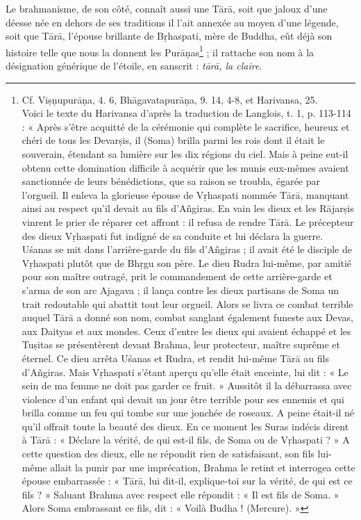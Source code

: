 \documentclass[a4paper, 11pt, oneside, french]{article}
\begin{document}
Le brahmanisme, de son côté, connaît aussi une T\={a}r\={a}, soit que jaloux d'une déesse née en dehors de ses traditions il l'ait annexée au moyen d'une légende, soit que T\={a}r\={a}, l'épouse brillante de B\d{r}haspati, mère de Buddha, eût déjà son histoire telle que nous la donnent les Pur\={a}\d{n}as\footnote{Cf. Vi\d{s}\d{n}upur\={a}\d{n}a, 4. 6, Bh\={a}gavatapur\={a}\d{n}a, 9. 14, 4-8, et Harivansa, 25.\\\hspace*{5mm}Voici le texte du Harivansa d'après la traduction de Langlois, t. 1, p. 113-114 : « Après s'être acquitté de la cérémonie qui complète le sacrifice, heureux et chéri de tous les Devar\d{s}is, il (Soma) brilla parmi les rois dont il était le souverain, étendant sa lumière sur les dix régions du ciel. Mais à peine eut-il obtenu cette domination difficile à acquérir que les munis eux-mêmes avaient sanctionnée de leurs bénédictions, que sa raison se troubla, égarée par l'orgueil. Il enleva la glorieuse épouse de V\d{r}haspati nommée T\={a}r\={a}, manquant ainsi au respect qu'il devait au fils d'A\~{n}giras. En vain les dieux et les R\={a}jar\d{s}is vinrent le prier de réparer cet affront : il refusa de rendre T\={a}r\={a}. Le précepteur des dieux V\d{r}haspati fut indigné de sa conduite et lui déclara la guerre. U\'{s}anas se mit dans l'arrière-garde du fils d'A\~{n}giras ; il avait été le disciple de V\d{r}haspati plutôt que de Bh\d{r}gu son père. Le dieu Rudra lui-même, par amitié pour son maître outragé, prit le commandement de cette arrière-garde et s'arma de son arc Ajagava ; il lança contre les dieux partisans de Soma un trait redoutable qui abattit tout leur orgueil. Alors se livra ce combat terrible auquel T\={a}r\={a} a donné son nom, combat sanglant également funeste aux Devas, aux Daityas et aux mondes. Ceux d'entre les dieux qui avaient échappé et les Tu\d{s}itas se présentèrent devant Brahma, leur protecteur, maître suprême et éternel. Ce dieu arrêta U\'{s}anas et Rudra, et rendit lui-même T\={a}r\={a} au fils d'A\~{n}giras. Mais V\d{r}haspati s'étant aperçu qu'elle était enceinte, lui dit : « Le sein de ma femme ne doit pas garder ce fruit. » Aussitôt il la débarrassa avec violence d'un enfant qui devait un jour être terrible pour ses ennemis et qui brilla comme un feu qui tombe sur une jonchée de roseaux. A peine était-il né qu'il offrait toute la beauté des dieux. En ce moment les Suras indécis dirent à T\={a}r\={a} : « Déclare la vérité, de qui est-il fils, de Soma ou de V\d{r}haspati ? » A cette question des dieux, elle ne répondit rien de satisfaisant, son fils lui-même allait la punir par une imprécation, Brahma le retint et interrogea cette épouse embarrassée : « T\={a}r\={a}, lui dit-il, explique-toi sur la vérité, de qui est ce fils ? » Saluant Brahma avec respect elle répondit : « Il est fils de Soma. » Alors Soma embrassant ce fils, dit : « Voilà Budha ! (Mercure). »} ; il rattache son nom à la désignation générique de l'étoile, en sanscrit : \emph{t\={a}r\={a}, la claire}.
\end{document}
